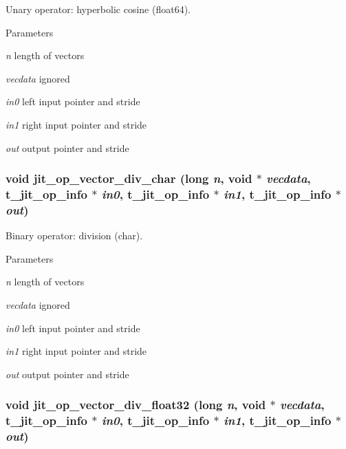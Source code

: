 Unary operator: hyperbolic cosine (float64). 
\begin{DoxyParams}{Parameters}
\item[{\em n}]length of vectors \item[{\em vecdata}]ignored \item[{\em in0}]left input pointer and stride \item[{\em in1}]right input pointer and stride \item[{\em out}]output pointer and stride \end{DoxyParams}
\hypertarget{group__opvecmod_ga5a286b075af860bac30e6e223cc900b8}{
\subsubsection[{jit\_\-op\_\-vector\_\-div\_\-char}]{\setlength{\rightskip}{0pt plus 5cm}void jit\_\-op\_\-vector\_\-div\_\-char (long {\em n}, \/  void $\ast$ {\em vecdata}, \/  {\bf t\_\-jit\_\-op\_\-info} $\ast$ {\em in0}, \/  {\bf t\_\-jit\_\-op\_\-info} $\ast$ {\em in1}, \/  {\bf t\_\-jit\_\-op\_\-info} $\ast$ {\em out})}}
\label{group__opvecmod_ga5a286b075af860bac30e6e223cc900b8}


Binary operator: division (char). 
\begin{DoxyParams}{Parameters}
\item[{\em n}]length of vectors \item[{\em vecdata}]ignored \item[{\em in0}]left input pointer and stride \item[{\em in1}]right input pointer and stride \item[{\em out}]output pointer and stride \end{DoxyParams}
\hypertarget{group__opvecmod_ga5519709ea63d802d96aef03267e2361e}{
\subsubsection[{jit\_\-op\_\-vector\_\-div\_\-float32}]{\setlength{\rightskip}{0pt plus 5cm}void jit\_\-op\_\-vector\_\-div\_\-float32 (long {\em n}, \/  void $\ast$ {\em vecdata}, \/  {\bf t\_\-jit\_\-op\_\-info} $\ast$ {\em in0}, \/  {\bf t\_\-jit\_\-op\_\-info} $\ast$ {\em in1}, \/  {\bf t\_\-jit\_\-op\_\-info} $\ast$ {\em out})}}
\label{group__opvecmod_ga5519709ea63d802d96aef03267e2361e}


